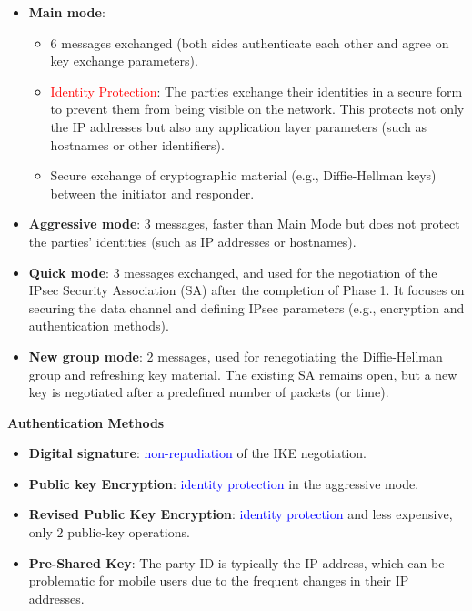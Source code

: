 \begin{itemize}
    \item \textbf{Main mode}:
    \begin{itemize}
        \item 6 messages exchanged (both sides authenticate each other and agree on key exchange parameters).
        \item \textcolor{red}{Identity Protection}: The parties exchange their identities in a secure form to prevent them from being visible on the network. This protects not only the IP addresses but also any application layer parameters (such as hostnames or other identifiers).
        \item Secure exchange of cryptographic material (e.g., Diffie-Hellman keys) between the initiator and responder.
    \end{itemize}
    \item \textbf{Aggressive mode}: 3 messages, faster than Main Mode but does not protect the parties' identities (such as IP addresses or hostnames). 
    \item \textbf{Quick mode}: 3 messages exchanged, and used for the negotiation of the IPsec Security Association (SA) after the completion of Phase 1. It focuses on securing the data channel and defining IPsec parameters (e.g., encryption and authentication methods).
    \item \textbf{New group mode}: 2 messages, used for renegotiating the Diffie-Hellman group and refreshing key material. The existing SA remains open, but a new key is negotiated after a predefined number of packets (or time).
\end{itemize}

\hfill

\textbf{Authentication Methods}

\hfill

\begin{itemize}
    \item \textbf{Digital signature}: \textcolor{Blue}{non-repudiation} of the IKE negotiation.
    \item \textbf{Public key Encryption}: \textcolor{Blue}{identity protection} in the aggressive mode.
    \item \textbf{Revised Public Key Encryption}: \textcolor{Blue}{identity protection} and less expensive, only 2 public-key operations.
    \item \textbf{Pre-Shared Key}: The party ID is typically the IP address, which can be problematic for mobile users due to the frequent changes in their IP addresses.
\end{itemize}

